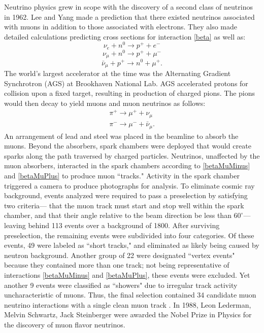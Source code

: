 Neutrino physics grew in scope  with the discovery of a second class of
neutrinos in 1962.  Lee and Yang made a prediction that there existed neutrinos
associated with muons in addition to those associated with electrons.  They
also made detailed calculations predicting cross sections for interaction
\eqref{beta} as well as:
\begin{equation} \label{betaMinus} \nu_e + n^0 \rightarrow p^+ + e^- \end{equation}
\begin{equation} \label{betaMuMinus}\nu_\mu + n^0 \rightarrow  p^+ + \mu^- \end{equation}
\begin{equation} \label{betaMuPlus}\bar{\nu}_\mu + p^+ \rightarrow n^0 + \mu^+ . \end{equation}
The world's largest accelerator at the time was the Alternating Gradient
Synchrotron (AGS) at Brookhaven National Lab.  AGS accelerated protons for
collision upon a fixed target, resulting in production of charged pions.  The
pions would then decay to yield muons and muon neutrinos as follows:
\begin{equation} \label{pions} \begin{split}
\pi^+ \rightarrow \mu^+ + \nu_\mu {\ } \\
\pi^- \rightarrow \mu^- + \bar{\nu}_\mu.
\end{split} \end{equation}
An arrangement of lead and steel was placed in the beamline to absorb the
 muons.  Beyond the absorbers, spark chambers were deployed that would create
 sparks along the path traversed by charged particles.  Neutrinos, unaffected
 by the muon absorbers, interacted in the spark chambers according to
 \eqref{betaMuMinus} and \eqref{betaMuPlus} to produce muon ``tracks."
 Activity in the spark chamber triggered a camera to produce photographs for
 analysis.  To eliminate cosmic ray background, events analyzed were required
 to pass a preselection by satisfying two criteria--- that the muon track must
 start and stop well within the spark chamber, and that their angle relative to
 the beam direction be less than $60^\circ$--- leaving behind 113 events over a
 background of 1800.  After surviving preselection, the remaining events were
 subdivided into four categories.  Of these events, 49 were labeled as
 ``short tracks," and eliminated as likely being caused by neutron background.
 Another group of 22 were designated ``vertex events"  because they contained
 more than one track; not being representative of interactions
 \eqref{betaMuMinus} and \eqref{betaMuPlus}, these events were excluded.  Yet
 another 9 events were classified as ``showers" due to irregular track activity
 uncharacteristic of muons.  Thus, the final selection contained 34 candidate
 muon neutrino interactions with a single clean muon track
 \cite{numuDiscovery}.
 In 1988, Leon Lederman, Melvin Schwartz, Jack Steinberger were awarded the
 Nobel Prize in Physics for the discovery of muon flavor neutrinos.

